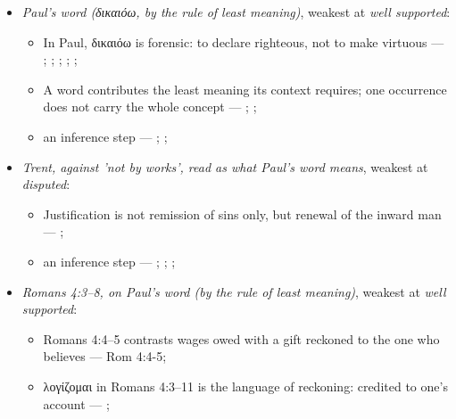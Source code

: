 \documentclass[11pt]{article}
\begin{document}
\begin{itemize}
\begin{itemize}
\item an inference step --- \cite{gathercole-where-boasting-2002}; \cite{carson-variegated-nomism-1-2001}
\end{itemize}
\item \emph{Paul's word (δικαιόω, by the rule of least meaning)}, weakest at \emph{well supported}:
\begin{itemize}
\item In Paul, δικαιόω is forensic: to declare righteous, not to make virtuous --- \cite[s.v. δικαιόω]{bauer-danker-lexicon-2000}; \cite{morris-apostolic-preaching-1965}; \cite[p. 80]{moo-romans-1996}; \cite{irons-righteousness-of-god-2015}; \cite{wright-justification-2009}; \cite[ad loc. Rom 3:24]{fitzmyer-romans-1993}
\item A word contributes the least meaning its context requires; one occurrence does not carry the whole concept --- \cite{silva-biblical-words-1994}; \cite{joos-semantic-axiom-1972}; \cite{barr-semantics-2004}
\item an inference step --- \cite{silva-biblical-words-1994}; \cite[p. 80]{moo-romans-1996}; \cite{barr-semantics-2004}
\end{itemize}
\item \emph{Trent, against 'not by works', read as what Paul's word means}, weakest at \emph{disputed}:
\begin{itemize}
\item Justification is not remission of sins only, but renewal of the inward man --- \cite[Trent, Session VI (1547), Decree on Justification, ch. 7]{tanner-decrees-1990}; \cite[Trent, Session VI (1547), canon 11]{tanner-decrees-1990}
\item an inference step --- \cite[Trent, Session VI (1547), Decree on Justification, ch. 8]{tanner-decrees-1990}; \cite[Trent, Session VI (1547), Decree on Justification, ch. 7]{tanner-decrees-1990}; \cite[On the Spirit and the Letter, ch. 45 (26.45)]{npnf1-05-1887}; \cite{mcgrath-iustitia-dei-2005}
\end{itemize}
\item \emph{Romans 4:3–8, on Paul's word (by the rule of least meaning)}, weakest at \emph{well supported}:
\begin{itemize}
\item Romans 4:4–5 contrasts wages owed with a gift reckoned to the one who believes --- Rom 4:4-5; \cite[III.xi.18]{calvin-institutes-1960}
\item λογίζομαι in Romans 4:3–11 is the language of reckoning: credited to one's account --- \cite[s.v. λογίζομαι]{bauer-danker-lexicon-2000}; \cite[ad loc. Rom 4:3]{moo-romans-1996}

\end{itemize}
\end{itemize}
\end{document}
